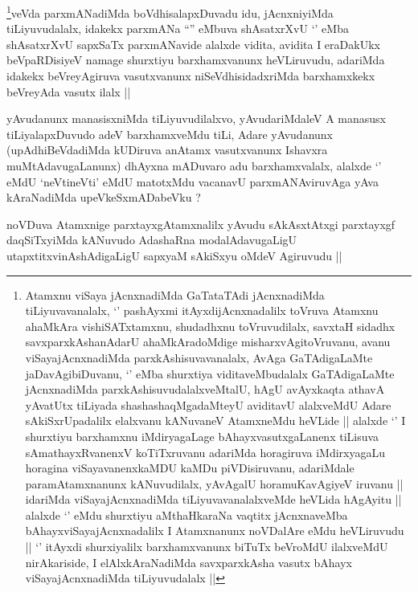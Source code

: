 \begin{artha}
\footnote[3]{Atamxnu viSaya jAcnxnadiMda GaTataTAdi jAcnxnadiMda
  tiLiyuvavanalalx, `\stext' pashAyxmi itAyxdijAcnxnadalilx toVruva
  Atamxnu ahaMkAra vishiSATxtamxnu, shudadhxnu toVruvudilalx, savxtaH
  sidadhx savxparxkAshanAdarU ahaMkAradoMdige misharxvAgitoVruvanu,
  avanu viSayajAcnxnadiMda parxkAshisuvavanalalx, AvAga GaTAdigaLaMte
  jaDavAgibiDuvanu, `\stext' eMba shurxtiya viditaveMbudalalx
  GaTAdigaLaMte jAcnxnadiMda parxkAshisuvudalalxveMtalU, hAgU
  avAyxkaqta athavA yAvatUtx tiLiyada shashashaqMgadaMteyU aviditavU
  alalxveMdU Adare sAkiSxrUpadalilx elalxvanu kANuvaneV AtamxneMdu
  heVLide || alalxde `\stext' I shurxtiyu  barxhamxnu iMdiryagaLage
  bAhayxvasutxgaLanenx tiLisuva sAmathayxRvanenxV koTiTxruvanu
  adariMda horagiruva iMdirxyagaLu horagina viSayavanenxkaMDU kaMDu
  piVDisiruvanu, adariMdale paramAtamxnanunx kANuvudilalx, yAvAgalU
  horamuKavAgiyeV iruvanu || idariMda viSayajAcnxnadiMda
  tiLiyuvavanalalxveMde heVLida hAgAyitu ||
alalxde `\stext' eMdu shurxtiyu aMthaHkaraNa vaqtitx jAcnxnaveMba
bAhayxviSayajAcnxnadalilx I Atamxnanunx noVDalAre eMdu heVLiruvudu ||
`\stext' itAyxdi shurxiyalilx barxhamxvanunx biTuTx beVroMdU
ilalxveMdU nirAkariside, I elAlxkAraNadiMda savxparxkAsha vasutx
bAhayx viSayajAcnxnadiMda tiLiyuvudalalx ||}veVda parxmANadiMda boVdhisalapxDuvadu idu, jAcnxniyiMda
tiLiyuvudalalx, idakekx parxmANa ``\stext'' eMbuva shAsatxrXvU
`\stext' eMba shAsatxrXvU sapxSaTx parxmANavide alalxde vidita,
avidita I eraDakUkx beVpaRDisiyeV namage shurxtiyu barxhamxvanunx
heVLiruvudu, adariMda idakekx beVreyAgiruva vasutxvanunx
niSeVdhisidadxriMda barxhamxkekx beVreyAda vasutx ilalx ||
\end{artha}


\begin{artha}
yAvudanunx manasisxniMda tiLiyuvudilalxvo, yAvudariMdaleV A manasusx
tiLiyalapxDuvudo adeV barxhamxveMdu tiLi, Adare yAvudanunx
(upAdhiBeVdadiMda kUDiruva anAtamx vasutxvanunx Ishavxra
muMtAdavugaLanunx) dhAyxna mADuvaro adu barxhamxvalalx, alalxde
`\stext' eMdU `neVtineVti' eMdU matotxMdu vacanavU parxmANAviruvAga
yAva kAraNadiMda upeVkeSxmADabeVku ?
\end{artha}


\begin{artha}
noVDuva Atamxnige parxtayxgAtamxnalilx yAvudu sAkAsxtAtxgi parxtayxgf
daqSiTxyiMda kANuvudo AdashaRna modalAdavugaLigU
utapxtitxvinAshAdigaLigU sapxyaM sAkiSxyu oMdeV Agiruvudu ||
\end{artha}

